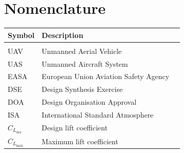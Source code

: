 \chapter*{Nomenclature}
\begingroup
\setlength{\LTleft}{0pt plus 1fill}
\setlength{\LTright}{0pt plus 1fill}
\renewcommand{\arraystretch}{1.2}

\begin{longtable}{%
>{\centering\arraybackslash}p{}
>{\raggedright\arraybackslash}p{}
>{\centering\arraybackslash}p{}
}
\toprule
\textbf{Symbol} & \textbf{Description}  \\
\midrule
\endhead

\bottomrule
\endfoot

\multicolumn{3}{l}{\textbf{Abbreviations}} \\
UAV  & Unmanned Aerial Vehicle \\
UAS  & Unmanned Aircraft System \\
EASA & European Union Aviation Safety Agency \\
DSE  & Design Synthesis Exercise \\
DOA   & Design Organisation Approval \\
ISA & International Standard Atmosphere \\
$C_{L_\text{des}}$ & Design lift coefficient \\
$C_{L_\text{max}}$ & Maximum lift coefficient \\
\end{longtable}

\endgroup